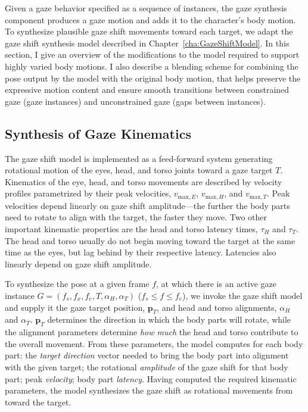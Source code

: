 Given a gaze behavior specified as a sequence of instances, the gaze synthesis component produces a gaze motion and adds it to the character's body motion. To synthesize plausible gaze shift movements toward each target, we adapt the gaze shift synthesis model described in Chapter~\ref{cha:GazeShiftModel}. In this section, I give an overview of the modifications to the model required to support highly varied body motions. I also describe a blending scheme for combining the pose output by the model with the original body motion, that helps preserve the expressive motion content and ensure smooth transitions between constrained gaze (gaze instances) and unconstrained gaze (gaps between instances).

\subsection{Synthesis of Gaze Kinematics}

The gaze shift model is implemented as a feed-forward system generating rotational motion of the eyes, head, and torso joints toward a gaze target $T$. Kinematics of the eye, head, and torso movements are described by velocity profiles parametrized by their peak velocities, $v_{\mathrm{max},E}$, $v_{\mathrm{max},H}$, and $v_{\mathrm{max},T}$. Peak velocities depend linearly on gaze shift amplitude---the further the body parts need to rotate to align with the target, the faster they move. Two other important kinematic properties are the head and torso latency times, $\tau_H$ and $\tau_T$. The head and torso usually do not begin moving toward the target at the same time as the eyes, but lag behind by their respective latency. Latencies also linearly depend on gaze shift amplitude.

To synthesize the pose at a given frame $f$, at which there is an active gaze instance $G = (f_s, f_x, f_e, T, \alpha_{H}, \alpha_{T})$ ($f_s \leq f \leq f_e$), we invoke the gaze shift model and supply it the gaze target position, $\mathbf{p}_T$, and head and torso alignments, $\alpha_H$ and $\alpha_T$. $\mathbf{p}_T$ determines the direction in which the body parts will rotate, while the alignment parameters determine \emph{how much} the head and torso contribute to the overall movement. From these parameters, the model computes for each body part: the \emph{target direction} vector needed to bring the body part into alignment with the given target; the rotational \emph{amplitude} of the gaze shift for that body part; peak \emph{velocity}; body part \emph{latency}. Having computed the required kinematic parameters, the model synthesizes the gaze shift as rotational movements from toward the target.


